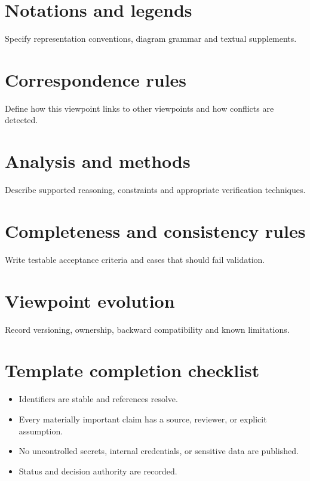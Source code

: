 \documentclass[10pt,letterpaper]{article}
\begin{document}
\section{Notations and legends}
Specify representation conventions, diagram grammar and textual supplements.

\section{Correspondence rules}
Define how this viewpoint links to other viewpoints and how conflicts are detected.

\section{Analysis and methods}
Describe supported reasoning, constraints and appropriate verification techniques.

\section{Completeness and consistency rules}
Write testable acceptance criteria and cases that should fail validation.

\section{Viewpoint evolution}
Record versioning, ownership, backward compatibility and known limitations.

\section{Template completion checklist}
\begin{itemize}
\item Identifiers are stable and references resolve.
\item Every materially important claim has a source, reviewer, or explicit assumption.
\item No uncontrolled secrets, internal credentials, or sensitive data are published.
\item Status and decision authority are recorded.
\end{itemize}
\end{document}
